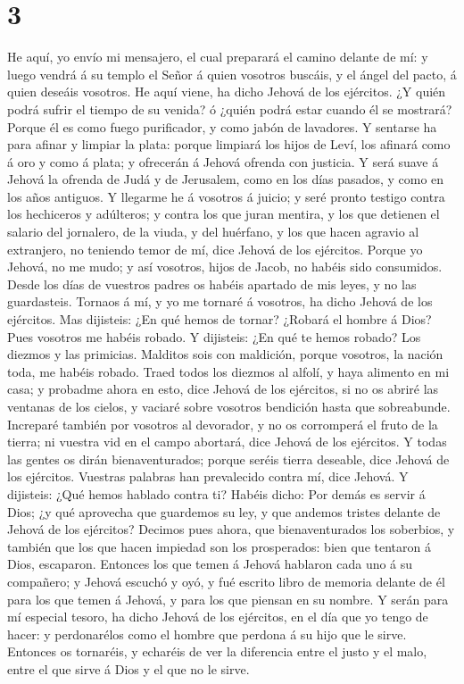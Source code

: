 \hypertarget{section-2}{%
\section{3}\label{section-2}}

 He aquí, yo envío mi mensajero, el cual preparará el
camino delante de mí: y luego vendrá á su templo el Señor á quien
vosotros buscáis, y el ángel del pacto, á quien deseáis vosotros. He
aquí viene, ha dicho Jehová de los ejércitos.  ¿Y quién
podrá sufrir el tiempo de su venida? ó ¿quién podrá estar cuando él se
mostrará? Porque él es como fuego purificador, y como jabón de
lavadores.  Y sentarse ha para afinar y limpiar la plata:
porque limpiará los hijos de Leví, los afinará como á oro y como á
plata; y ofrecerán á Jehová ofrenda con justicia.  Y será
suave á Jehová la ofrenda de Judá y de Jerusalem, como en los días
pasados, y como en los años antiguos.  Y llegarme he á
vosotros á juicio; y seré pronto testigo contra los hechiceros y
adúlteros; y contra los que juran mentira, y los que detienen el salario
del jornalero, de la viuda, y del huérfano, y los que hacen agravio al
extranjero, no teniendo temor de mí, dice Jehová de los ejércitos.
 Porque yo Jehová, no me mudo; y así vosotros, hijos de
Jacob, no habéis sido consumidos.  Desde los días de
vuestros padres os habéis apartado de mis leyes, y no las guardasteis.
Tornaos á mí, y yo me tornaré á vosotros, ha dicho Jehová de los
ejércitos. Mas dijisteis: ¿En qué hemos de tornar? 
¿Robará el hombre á Dios? Pues vosotros me habéis robado. Y dijisteis:
¿En qué te hemos robado? Los diezmos y las primicias. 
Malditos sois con maldición, porque vosotros, la nación toda, me habéis
robado.  Traed todos los diezmos al alfolí, y haya
alimento en mi casa; y probadme ahora en esto, dice Jehová de los
ejércitos, si no os abriré las ventanas de los cielos, y vaciaré sobre
vosotros bendición hasta que sobreabunde.  Increparé
también por vosotros al devorador, y no os corromperá el fruto de la
tierra; ni vuestra vid en el campo abortará, dice Jehová de los
ejércitos.  Y todas las gentes os dirán bienaventurados;
porque seréis tierra deseable, dice Jehová de los ejércitos.
 Vuestras palabras han prevalecido contra mí, dice
Jehová. Y dijisteis: ¿Qué hemos hablado contra ti? 
Habéis dicho: Por demás es servir á Dios; ¿y qué aprovecha que guardemos
su ley, y que andemos tristes delante de Jehová de los ejércitos?
 Decimos pues ahora, que bienaventurados los soberbios, y
también que los que hacen impiedad son los prosperados: bien que
tentaron á Dios, escaparon.  Entonces los que temen á
Jehová hablaron cada uno á su compañero; y Jehová escuchó y oyó, y fué
escrito libro de memoria delante de él para los que temen á Jehová, y
para los que piensan en su nombre.  Y serán para mí
especial tesoro, ha dicho Jehová de los ejércitos, en el día que yo
tengo de hacer: y perdonarélos como el hombre que perdona á su hijo que
le sirve.  Entonces os tornaréis, y echaréis de ver la
diferencia entre el justo y el malo, entre el que sirve á Dios y el que
no le sirve.

